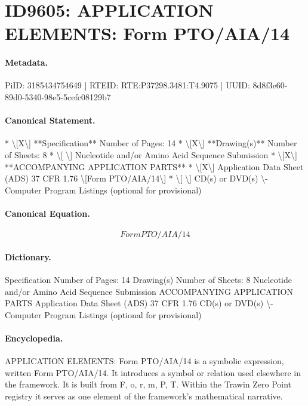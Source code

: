 \section*{ID9605: APPLICATION ELEMENTS: Form PTO/AIA/14}
\paragraph{Metadata.}
PiID: 3185434754649 | RTEID: RTE:P37298.3481:T4.9075 | UUID: 8d8f3e60-89d0-5340-98e5-5cefc08129b7

\paragraph{Canonical Statement.}
* \textbackslash{}[X\textbackslash{}] **Specification** Number of Pages: 14 * \textbackslash{}[X\textbackslash{}] **Drawing(s)** Number of Sheets: 8 * \textbackslash{}[ \textbackslash{}] Nucleotide and/or Amino Acid Sequence Submission * \textbackslash{}[X\textbackslash{}] **ACCOMPANYING APPLICATION PARTS** * \textbackslash{}[X\textbackslash{}] Application Data Sheet (ADS) 37 CFR 1.76 \textbackslash{}[Form PTO/AIA/14\textbackslash{}] * \textbackslash{}[ \textbackslash{}] CD(s) or DVD(s) \textbackslash{}- Computer Program Listings (optional for provisional)

\paragraph{Canonical Equation.}
\[
Form PTO/AIA/14
\]

\paragraph{Dictionary.}
Specification Number of Pages: 14 Drawing(s) Number of Sheets: 8 Nucleotide and/or Amino Acid Sequence Submission ACCOMPANYING APPLICATION PARTS Application Data Sheet (ADS) 37 CFR 1.76 CD(s) or DVD(s) \textbackslash{}- Computer Program Listings (optional for provisional)

\paragraph{Encyclopedia.}
APPLICATION ELEMENTS: Form PTO/AIA/14 is a symbolic expression, written Form PTO/AIA/14. It introduces a symbol or relation used elsewhere in the framework. It is built from F, o, r, m, P, T. Within the Trawin Zero Point registry it serves as one element of the framework's mathematical narrative.
